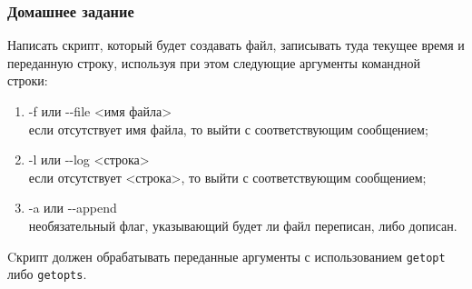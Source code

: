 \begin{frame}
\frametitle{Домашнее задание}

	Написать скрипт, который будет создавать файл, 
	записывать туда текущее время и переданную строку,
	используя при этом следующие аргументы командной строки: 

	\begin{enumerate}
		\item -f или -{}-file <имя файла>\\
			если отсутствует имя файла, то выйти с соответствующим сообщением;
		\item -l или -{}-log <строка>\\
			если отсутствует <строка>, то выйти с соответствующим сообщением;
		\item -a или -{}-append \\
			необязательный флаг, указывающий будет ли файл переписан, либо дописан.
	\end{enumerate}

	Cкрипт должен обрабатывать переданные аргументы с использованием {\tt getopt} либо {\tt getopts}.

\end{frame}
